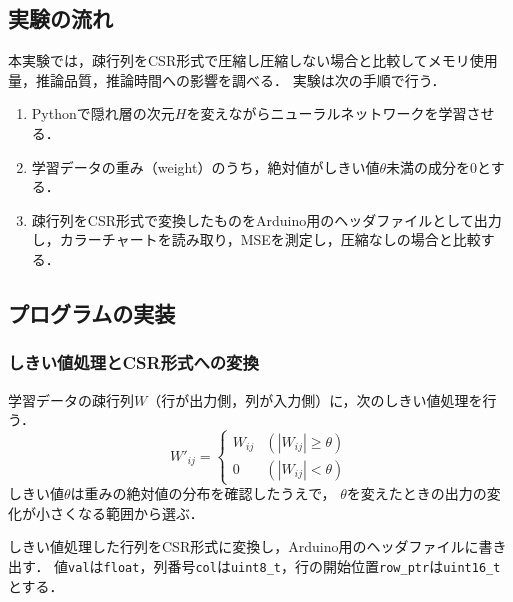 \documentclass[a4paper,11pt,uplatex,dvipdfmx]{jsarticle}
\begin{document}
\subsection{実験の流れ}

本実験では，疎行列をCSR形式で圧縮し圧縮しない場合と比較してメモリ使用量，推論品質，推論時間への影響を調べる．
実験は次の手順で行う．

\begin{enumerate}
  \item Pythonで隠れ層の次元$H$を変えながらニューラルネットワークを学習させる．
  \item 学習データの重み（weight）のうち，絶対値がしきい値$\theta$未満の成分を0とする．
  \item 疎行列をCSR形式で変換したものをArduino用のヘッダファイルとして出力し，カラーチャートを読み取り，MSEを測定し，圧縮なしの場合と比較する．
\end{enumerate}

\subsection{プログラムの実装}

\subsubsection{しきい値処理とCSR形式への変換}

学習データの疎行列$W$（行が出力側，列が入力側）に，次のしきい値処理を行う．
\begin{equation}
  W'_{ij} =
  \begin{cases}
    W_{ij} & (|W_{ij}| \geq \theta) \\
    0      & (|W_{ij}| < \theta)
  \end{cases}
\end{equation}
しきい値$\theta$は重みの絶対値の分布を確認したうえで，
$\theta$を変えたときの出力の変化が小さくなる範囲から選ぶ．

しきい値処理した行列をCSR形式に変換し，Arduino用のヘッダファイルに書き出す．
値\texttt{val}は\texttt{float}，列番号\texttt{col}は\texttt{uint8\_t}，行の開始位置\texttt{row\_ptr}は\texttt{uint16\_t}とする．
\end{document}
